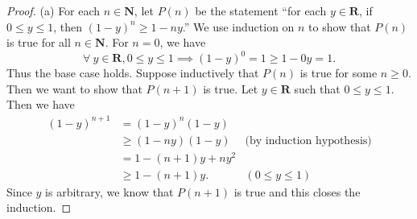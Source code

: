 \begin{proof}{(a)}
    For each \(n \in \mathbf{N}\), let \(P(n)\) be the statement ``for each \(y \in \mathbf{R}\), if \(0 \leq y \leq 1\), then \((1 - y)^n \geq 1 - ny\).''
    We use induction on \(n\) to show that \(P(n)\) is true for all \(n \in \mathbf{N}\).
    For \(n = 0\), we have
    \[
        \forall\ y \in \mathbf{R}, 0 \leq y \leq 1 \implies (1 - y)^0 = 1 \geq 1 - 0y = 1.
    \]
    Thus the base case holds.
    Suppose inductively that \(P(n)\) is true for some \(n \geq 0\).
    Then we want to show that \(P(n + 1)\) is true.
    Let \(y \in \mathbf{R}\) such that \(0 \leq y \leq 1\).
    Then we have
    \begin{align*}
        (1 - y)^{n + 1} & = (1 - y)^n (1 - y)                                       \\
                        & \geq (1 - ny) (1 - y)  & \text{(by induction hypothesis)} \\
                        & = 1 - (n + 1)y + n y^2                                    \\
                        & \geq 1 - (n + 1)y.     & (0 \leq y \leq 1)
    \end{align*}
    Since \(y\) is arbitrary, we know that \(P(n + 1)\) is true and this closes the induction.
\end{proof}

